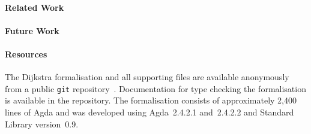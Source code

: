 \paragraph{Related Work}

\paragraph{Future Work}

\paragraph{Resources}

The Dijkstra formalisation and all supporting files are available anonymously from a public \texttt{git} repository~\cite{markert_formalised_2015}.
Documentation for type checking the formalisation is available in the repository.
The formalisation consists of approximately 2,400 lines of Agda and was developed using Agda~2.4.2.1 and~2.4.2.2 and Standard Library version~0.9.
